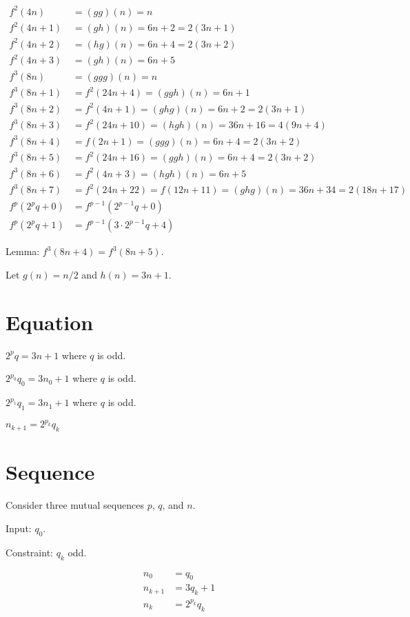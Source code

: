 \begin{align*}
    f^2(4n) &= (gg)(n) = n
    \\
    f^2(4n+1) &= (gh)(n) = 6n+2 = 2(3n+1)
    \\
    f^2(4n+2) &= (hg)(n) = 6n+4 = 2(3n+2)
    \\
    f^2(4n+3) &= (gh)(n) = 6n+5
    \\
    f^3(8n) &= (ggg)(n) = n
    \\
    f^3(8n+1) &= f^2(24n+4) = (ggh)(n) = 6n+1
    \\
    f^3(8n+2) &= f^2(4n+1) = (ghg)(n) = 6n+2 = 2(3n+1)
    \\
    f^3(8n+3) &= f^2(24n+10) = (hgh)(n) = 36n+16 = 4(9n+4)
    \\
    f^3(8n+4) &= f(2n+1) = (ggg)(n) = 6n+4 = 2(3n+2)
    \\
    f^3(8n+5) &= f^2(24n+16) = (ggh)(n) = 6n+4 = 2(3n+2)
    \\
    f^3(8n+6) &= f^2(4n+3) = (hgh)(n) = 6n+5
    \\
    f^3(8n+7) &= f^2(24n+22) = f(12n+11) = (ghg)(n) = 36n+34 = 2(18n+17)
    \\
    f^p(2^p q+0) &= f^{p-1}(2^{p-1} q+0)
    \\
    f^p(2^p q+1) &= f^{p-1}(3 \cdot 2^{p-1} q+4)
\end{align*}

Lemma: \(f^3(8n+4) = f^3(8n+5)\).

Let \(g(n) = n/2\) and \(h(n) = 3n+1\).

\section{Equation}

\(2^p q = 3 n + 1\) where \(q\) is odd.

\(2^{p_0} q_0 = 3 n_0 + 1\) where \(q\) is odd.

\(2^{p_1} q_1 = 3 n_1 + 1\) where \(q\) is odd.

\(n_{k+1} = 2^{p_k} q_k\)

\section{Sequence}

Consider three mutual sequences \(p\), \(q\), and \(n\).

Input: \(q_0\).

Constraint: \(q_k\) odd.

\begin{align*}
    n_0 &= q_0
    \\
    n_{k+1} &= 3 q_k + 1
    \\
    n_k &= 2^{p_k} q_k
\end{align*}

